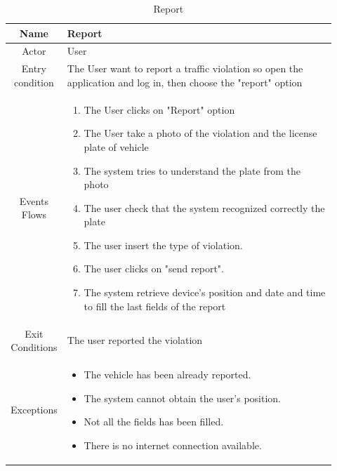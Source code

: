 \documentclass[12pt,a4paper]{report}
\begin{document}
				\begin{table}[H]
					\centering
					\begin{tabular}{|c|p{0.92\linewidth}|}
						\hline
						Name & {Report} \\
						\hline
						Actor & {User} \\
						\hline
						Entry condition & {The User want to report a traffic violation so open the application and log in,
									then choose the "report" option} \\
						\hline
						Events Flows &{ 
								\vskip 4pt
								\begin{enumerate}
									\item The User clicks on "Report" option
									\item The User take a photo of the violation and the license plate of vehicle
									\item The system tries to understand the plate from the photo
									\item The user check that the system recognized correctly the plate
									\item The user insert the type of violation.
									\item The user clicks on "send report".
									\item The system retrieve device's position and date and time to fill the last fields
										of the report
								\end{enumerate}
								\vskip 4pt}\\
						\hline
						Exit Conditions & {The user reported the violation} \\
						\hline
						Exceptions & {
								\vskip 4pt
								\begin{itemize}
									\item The vehicle has been already reported.
									\item The system cannot obtain the user's position.
									\item Not all the fields has been filled.
									\item There is no internet connection available.
								\end{itemize}
								\vskip 4pt
						} \\
						\hline
					\end{tabular}
					\caption{Report}
					\label{tab: }
				\end{table}
\end{document}
